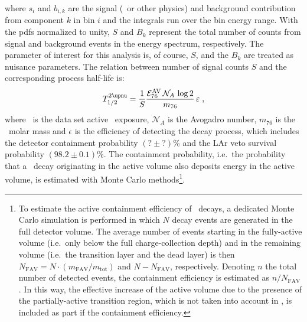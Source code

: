 where $s_i$ and $b_{i,k}$ are the signal (\nnbb\ or other physics) and background
contribution from component $k$ in bin $i$ and the integrals run over the bin energy
range. With the pdfs normalized to unity, $S$ and $B_k$ represent the total number of
counts from signal and background events in the energy spectrum, respectively. The
parameter of interest for this analysis is, of course, $S$, and the $B_k$ are treated as
nuisance parameters. The relation between number of signal counts $S$ and the
corresponding process half-life is:
\begin{equation}\label{eq:2nbb:halflife}
  \thalftwoM = \frac{1}{S} \frac{\expoM_{76}^\text{AV}\, \mathcal{N}_A\, \log2}{m_{76}}\, \epsilon \;,
\end{equation}
where \expoGesixAV\ is the data set active \gesix\ exposure, $\mathcal{N}_A$ is
the Avogadro number, $m_{76}$ is the \gesix\ molar mass and $\epsilon$ is the efficiency
of detecting the decay process, which includes the detector containment probability $(?
\pm ?)$\% and the LAr veto survival probability $(98.2 \pm 0.1)$\%. The containment
probability, i.e.~the probability that a \nnbb\ decay originating in the active volume
also deposits energy in the active volume, is estimated with Monte Carlo
methods\footnote{%
  To estimate the active containment efficiency of \nnbb\ decays, a dedicated Monte Carlo
  simulation is performed in which $N$ decay events are generated in the full detector
  volume. The average number of events starting in the fully-active volume (i.e.~only
  below the full charge-collection depth) and in the remaining volume (i.e.~the transition
  layer and the dead layer) is then $N_\text{FAV} = N \cdot (m_\text{FAV} / m_\text{tot})$
  and $N - N_\text{FAV}$, respectively. Denoting $n$ the total number of detected events,
  the containment efficiency is estimated as $n / N_\text{FAV}$. In this way, the
  effective increase of the active volume due to the presence of the partially-active
  transition region, which is not taken into account in \expoGesixAV, is included as part
  if the containment efficiency.
}.

